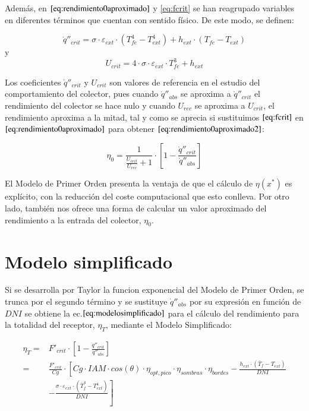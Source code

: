 Además, en $\eqref{eq:rendimiento0aproximado}$ y \eqref{eq:fcrit} se han reagrupado variables en diferentes términos que cuentan con sentido físico. De este modo, se definen:

\begin{equation}
    \dot q''_{crit} = \sigma \cdot \varepsilon_{ext} \cdot \left(T^{4}_{fe}- T^{4}_{ext}\right)+h_{ext} \cdot \left(T_{fe}- T_{ext}\right)
    \label{eq:qcrit}
\end{equation}
y
\begin{equation}
    U_{crit} = 4 \cdot \sigma \cdot \varepsilon_{ext} \cdot T^{3}_{fe} + h_{ext}
    \label{eq:ucrit}
\end{equation}

Los coeficientes \(\dot q''_{crit}\) y \(U_{crit}\) son valores de referencia en el estudio del comportamiento del colector, pues cuando \(\dot q''_{abs}\) se aproxima a \(\dot q''_{crit}\) el rendimiento del colector se hace nulo y cuando \(U_{rec}\) se aproxima a \(U_{crit}\), el rendimiento aproxima a la mitad, tal y como se aprecia si sustituimos $\eqref{eq:fcrit}$ en $\eqref{eq:rendimiento0aproximado}$ para obtener $\eqref{eq:rendimiento0aproximado2}$:

\begin{equation}
    \eta_{0} = \frac{1}{\frac{U_{crit}}{U_{rec}}+1} \cdot \left[1-\frac{\dot q''_{crit}}{\dot q''_{abs}}\right] 
    \label{eq:rendimiento0aproximado2}
\end{equation}

El Modelo de Primer Orden presenta la ventaja de que el cálculo de \(\eta(x^{*})\) es explícito, con la reducción del coste computacional que esto conlleva. Por otro lado, también nos ofrece una forma de calcular un valor aproximado del rendimiento a la entrada del colector, \(\eta_{0}\).

\section{Modelo simplificado}
Si se desarrolla por Taylor la funcion exponencial del Modelo de Primer Orden, se trunca por el segundo término y se sustituye \(\dot q''_{abs}\) por su expresión en función de \(DNI\) se obtiene la ec.\(\eqref{eq:modelosimplificado}\) para el cálculo del rendimiento para la totalidad del receptor, $\eta_{T}$, mediante el Modelo Simplificado:

\begin{equation}
\begin{split}
\eta_{T}	 = & F'_{crit} \cdot \left[1 - \frac{\dot q''_{crit}}{\dot q''_{abs}}\right]  \\
 		 = & \frac{F'_{crit}}{Cg} \cdot \left[Cg \cdot IAM \cdot cos(\theta) \cdot \eta_{opt,pico} \cdot \eta_{sombras} \cdot \eta_{bordes}\right. - \frac{h_{ext}\cdot (\bar{T}_{f}-T_{ext})}{DNI} \\
& \left. - \frac{\sigma \cdot \varepsilon_{ext}\cdot(\bar{T}^{4}_{f}-T^{4}_{ext})}{DNI}\right] 
\end{split}
    \label{eq:modelosimplificado}
\end{equation}

